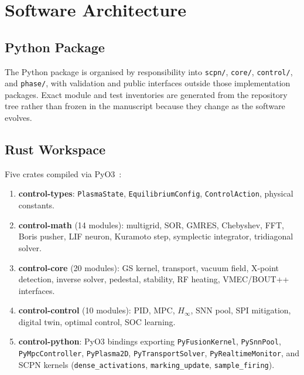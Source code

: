 \documentclass[twocolumn,preprintnumbers,amsmath,amssymb,prl,floatfix]{revtex4-2}
\begin{document}
\section{Software Architecture}
\label{sec:software}

\subsection{Python Package}

The Python package is organised by responsibility into \texttt{scpn/},
\texttt{core/}, \texttt{control/}, and \texttt{phase/}, with validation and
public interfaces outside those implementation packages. Exact module and test
inventories are generated from the repository tree rather than frozen in the
manuscript because they change as the software evolves.

\subsection{Rust Workspace}
\label{sec:rust}

Five crates compiled via PyO3~\cite{pyo3}:

\begin{enumerate}
\item \textbf{control-types}: \texttt{PlasmaState},
  \texttt{EquilibriumConfig}, \texttt{ControlAction},
  physical constants.
\item \textbf{control-math} (14 modules): multigrid, SOR,
  GMRES, Chebyshev, FFT, Boris pusher, LIF neuron, Kuramoto
  step, symplectic integrator, tridiagonal solver.
\item \textbf{control-core} (20 modules): GS kernel,
  transport, vacuum field, X-point detection, inverse solver,
  pedestal, stability, RF heating, VMEC/BOUT++ interfaces.
\item \textbf{control-control} (10 modules): PID, MPC,
  $H_\infty$, SNN pool, SPI mitigation, digital twin,
  optimal control, SOC learning.
\item \textbf{control-python}: PyO3 bindings exporting
  \texttt{PyFusionKernel}, \texttt{PySnnPool},
  \texttt{PyMpcController}, \texttt{PyPlasma2D},
  \texttt{PyTransportSolver}, \texttt{PyRealtimeMonitor},
  and SCPN kernels (\texttt{dense\_activations},
  \texttt{marking\_update}, \texttt{sample\_firing}).
\end{enumerate}
\end{document}
